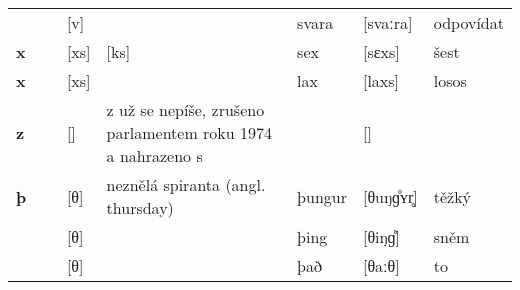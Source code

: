 \begin{longtable}{>{\bfseries}lX>{\IPAFont}lXl>{\IPAFont}ll}
 &  & {[v]} &   & svara & {[svaːra]} & odpovídat \\ 
x &  & {[xs]} & [ks] & sex & {[sɛxs]} & šest \\ 
x  &  & {[xs]} &   & lax & {[laxs]} & losos \\ 
z &  & {[]} & z už se nepíše, zrušeno parlamentem roku 1974 a nahrazeno s &   & {[]} &  \\ 
þ &  & {[θ]} & neznělá spiranta (angl. thursday) & þungur & {[θuŋɡ̊ʏr̥]} & těžký \\ 
 &  & {[θ]} &   & þing & {[θiŋɡ̊]} & sněm \\ 
 &  & {[θ]} &   & það & {[θaːθ]} & to \\ 
\bottomrule
\end{longtable}

